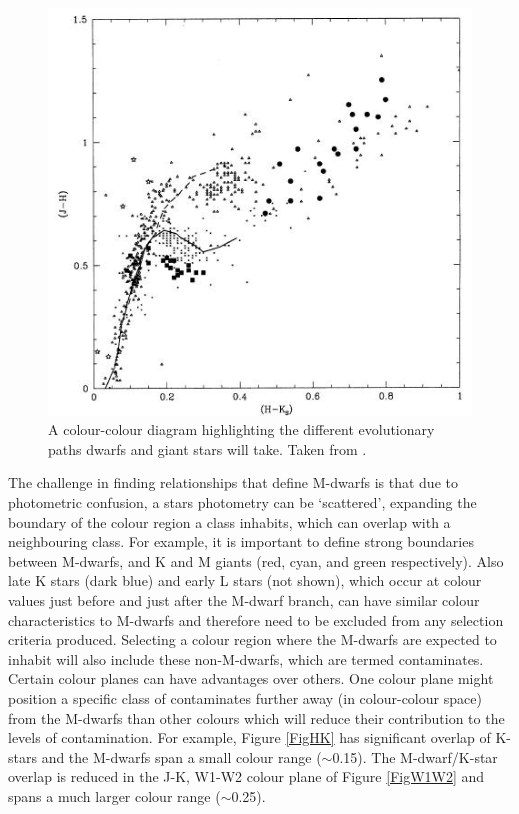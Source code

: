 \begin{figure}[!t]
	\centering
	\includegraphics[width=\textwidth]{FigCol.jpg}
	\caption{A colour-colour diagram highlighting the different evolutionary paths dwarfs and giant stars will take. Taken from \citet{2005Reid}.} 
	\label{FigCol}
\end{figure}
The challenge in finding relationships that define M-dwarfs is that due to photometric confusion, a stars photometry can be `scattered', expanding the boundary of the colour region a class inhabits, which can overlap with a neighbouring class. For example, it is important to define strong boundaries between M-dwarfs, and K and M giants (red, cyan, and green respectively). Also late K stars (dark blue) and early L stars (not shown), which occur at colour values just before and just after the M-dwarf branch, can have similar colour characteristics to M-dwarfs and therefore need to be excluded from any selection criteria produced. Selecting a colour region where the M-dwarfs are expected to inhabit will also include these non-M-dwarfs, which are termed contaminates. Certain colour planes can have advantages over others. One colour plane might position a specific class of contaminates further away (in colour-colour space) from the M-dwarfs than other colours which will reduce their contribution to the levels of contamination. For example, Figure \ref{FigHK} has significant overlap of K-stars and the M-dwarfs span a small colour range ($\sim$0.15). The M-dwarf/K-star overlap is reduced in the J-K, W1-W2 colour plane of Figure \ref{FigW1W2} and spans a much larger colour range ($\sim$0.25).\\
